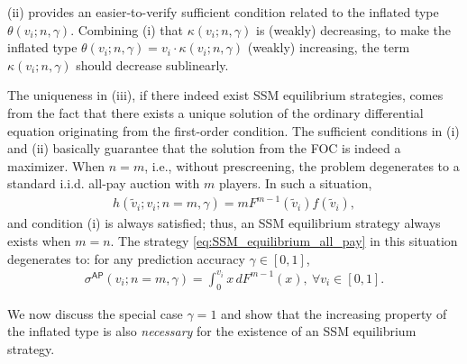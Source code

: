  (ii) provides an easier-to-verify sufficient condition related to the inflated type $\theta(v_i;n,\gamma)$. Combining  (i) that $\kappa(v_i;n,\gamma)$ is (weakly) decreasing, to make the inflated type $\theta(v_i;n,\gamma)=v_i\cdot \kappa(v_i;n,\gamma)$ (weakly) increasing, the term $\kappa(v_i;n,\gamma)$ should decrease sublinearly.

The uniqueness in  (iii), if there indeed exist SSM equilibrium strategies, comes from the fact that there exists a unique solution of the ordinary differential equation originating from the first-order condition. The sufficient conditions in (i) and (ii) basically guarantee that the solution from the FOC is indeed a maximizer. When $n=m$, i.e., without prescreening, the problem degenerates to a standard i.i.d. all-pay auction with $m$ players. In such a situation, 
\begin{align*}
 h(\tilde{v}_i;v_i;n=m,\gamma)=mF^{m-1}(\tilde{v}_i)f(\tilde{v}_i),
\end{align*}
and condition (i) is always satisfied; thus, an SSM equilibrium strategy always exists when $m=n$. The strategy \eqref{eq:SSM_equilibrium_all_pay} in this situation degenerates to: for any prediction accuracy $\gamma\in [0,1]$,
\begin{align}
\label{eq:equilibrium_standard_allpay}
 \sigma^{\mathsf{AP}}(v_i;n=m,\gamma) = \int_0^{v_i}x\,dF^{m-1}(x),~ \forall v_i\in[0,1].   
\end{align}




We now discuss the special case $\gamma=1$ and show that the increasing property of the inflated type is also \textit{necessary} for the existence of an SSM equilibrium strategy.

